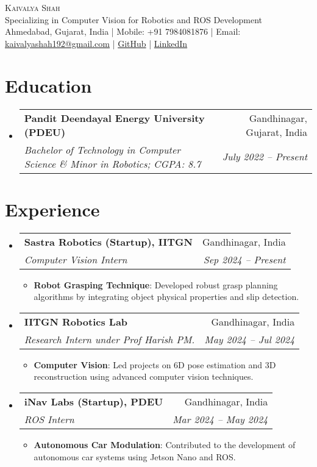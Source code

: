 \documentclass[letterpaper,11pt]{article}
\makeatletter
\newcommand{\resumeItem}[2]{
  \item\small{
    \textbf{#1}{: #2 \vspace{-2pt}}
  }
}
\newcommand{\resumeSubheading}[4]{
  \vspace{-1pt}\item
    \begin{tabular*}{0.97\textwidth}{l@{\extracolsep{\fill}}r}
      \textbf{#1} & #2 \\
      \textit{\small#3} & \textit{\small #4} \\
    \end{tabular*}\vspace{-5pt}
}
\newcommand{\resumeSubHeadingListStart}{\begin{itemize}[leftmargin=*]}
\newcommand{\resumeSubHeadingListEnd}{\end{itemize}}
\newcommand{\resumeItemListStart}{\begin{itemize}}
\newcommand{\resumeItemListEnd}{\end{itemize}\vspace{-5pt}}
\makeatother
\begin{document}
\begin{center}
  {\Huge \scshape Kaivalya Shah} \\ \vspace{1pt}
  Specializing in Computer Vision for Robotics and ROS Development \\ \vspace{1pt}
  \small Ahmedabad, Gujarat, India | Mobile: +91 7984081876 | Email: \href{mailto:kaivalyashah192@gmail.com}{kaivalyashah192@gmail.com} | \href{https://github.com/Kaivalya192}{GitHub} | \href{https://www.linkedin.com/in/kaivalya192/}{LinkedIn}
\end{center}

\section{Education}
\resumeSubHeadingListStart
  \resumeSubheading
    {Pandit Deendayal Energy University (PDEU)}{Gandhinagar, Gujarat, India}
    {Bachelor of Technology in Computer Science \& Minor in Robotics; CGPA: 8.7}{July 2022 -- Present}
\resumeSubHeadingListEnd

\section{Experience}
\resumeSubHeadingListStart
  \resumeSubheading
    {Sastra Robotics (Startup), IITGN}{Gandhinagar, India}
    {Computer Vision Intern}{Sep 2024 -- Present}
    \resumeItemListStart
      \resumeItem{Robot Grasping Technique}
        {Developed robust grasp planning algorithms by integrating object physical properties and slip detection.}
    \resumeItemListEnd

  \resumeSubheading
    {IITGN Robotics Lab}{Gandhinagar, India}
    {Research Intern under Prof Harish PM.}{May 2024 -- Jul 2024}
    \resumeItemListStart
      \resumeItem{Computer Vision}
        {Led projects on 6D pose estimation and 3D reconstruction using advanced computer vision techniques.}
    \resumeItemListEnd

  \resumeSubheading
    {iNav Labs (Startup), PDEU}{Gandhinagar, India}
    {ROS Intern}{Mar 2024 -- May 2024}
    \resumeItemListStart
      \resumeItem{Autonomous Car Modulation}
        {Contributed to the development of autonomous car systems using Jetson Nano and ROS.}
    \resumeItemListEnd
\resumeSubHeadingListEnd

\end{document}

